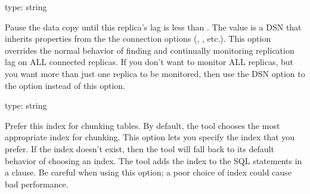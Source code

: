 \documentclass[letterpaper,10pt,english]{sphinxmanual}
\begin{document}
\begin{fulllineitems}
\label{\detokenize{mariadb-schema-change:cmdoption-mariadb-schema-change-check-slave-lag}}
\sphinxAtStartPar
type: string

\sphinxAtStartPar
Pause the data copy until this replica’s lag is less than {\hyperref[\detokenize{mariadb-schema-change:cmdoption-mariadb-schema-change-max-lag}]{}}.  The
value is a DSN that inherits properties from the the connection options
({\hyperref[\detokenize{mariadb-schema-change:cmdoption-mariadb-schema-change-port}]{}}, {\hyperref[\detokenize{mariadb-schema-change:cmdoption-mariadb-schema-change-user}]{}}, etc.).  This option overrides the normal behavior of
finding and continually monitoring replication lag on ALL connected replicas.
If you don’t want to monitor ALL replicas, but you want more than just one
replica to be monitored, then use the DSN option to the {\hyperref[\detokenize{mariadb-schema-change:cmdoption-mariadb-schema-change-recursion-method}]{}}
option instead of this option.

\end{fulllineitems}


\begin{fulllineitems}
\label{\detokenize{mariadb-schema-change:cmdoption-mariadb-schema-change-chunk-index}}
\sphinxAtStartPar
type: string

\sphinxAtStartPar
Prefer this index for chunking tables.  By default, the tool chooses the most
appropriate index for chunking.  This option lets you specify the index that you
prefer.  If the index doesn’t exist, then the tool will fall back to its default
behavior of choosing an index.  The tool adds the index to the SQL statements in
a  clause.  Be careful when using this option; a poor choice of
index could cause bad performance.

\end{fulllineitems}
\end{document}
